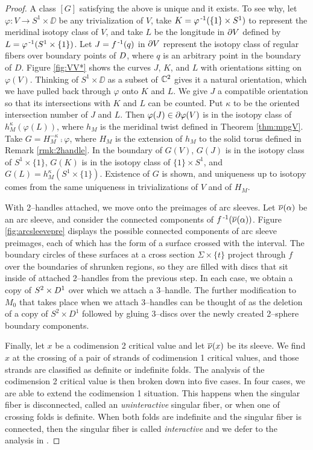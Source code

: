 \begin{proof}
	A class $[G]$ satisfying the above is unique and it exists.
	To see why, let $\varphi:V\to S^1\times\DD$ be any trivialization of $V$, take $K=\varphi^{\,\text{-}1}(\{1\}\times S^1)$ to represent the meridinal isotopy class of $V$, and take $L$ be the longitude in $\partial V$ defined by $L=\varphi^{\,\text{-}1}(S^1\times\{1\})$.
	Let $J=f^{\,\text{-}1}(q)$ in $\partial V$ represent the isotopy class of regular fibers over boundary points of $D$, where $q$ is an arbitrary point in the boundary of $D$.	
	Figure \ref{fig:VV*} shows the curves $J$, $K$, and $L$ with orientations sitting on $\varphi(V)$.
	Thinking of $S^1\times\DD$ as a subset of $\mathbb{C}^2$ gives it a natural orientation, which we have pulled back through $\varphi$ onto $K$ and $L$.
	We give $J$ a compatible orientation so that its intersections with $K$ and $L$ can be counted.
	Put $\kappa$ to be the oriented intersection number of $J$ and $L$.
	Then $\varphi(J)\in \partial\varphi(V)$ is in the isotopy class of $h_M^{\kappa}(\varphi(L))$, where $h_M$ is the meridinal twist defined in Theorem \ref{thm:mpgV}.
	Take $G=H_M^{-\kappa}\comp\varphi$, where $H_M$ is the extension of $h_M$ to the solid torus defined in Remark \ref{rmk:2handle}.
	In the boundary of $G(V)$, $G(J)$ is in the isotopy class of $S^1\times\{1\}$, $G(K)$ is in the isotopy class of $\{1\}\times S^1$, and $G(L)=h_M^\kappa(S^1\times\{1\})$.
	Existence of $G$ is shown, and uniqueness up to isotopy comes from the same uniqueness in trivializations of $V$ and of $H_M$.
		
	With 2--handles attached, we move onto the preimages of arc sleeves.
	Let $\overline{\nu}(\alpha)$ be an arc sleeve, and consider the connected components of $f^{\,\text{-}1}(\overline{\nu}(\alpha))$.
	Figure \ref{fig:arcsleevepre} displays the possible connected components of arc sleeve preimages, each of which has the form of a surface crossed with the interval.
	The boundary circles of these surfaces at a cross section $\Sigma\times\{t\}$ project through $f$ over the boundaries of shrunken regions, so they are filled with discs that sit inside of attached 2--handles from the previous step.
	In each case, we obtain a copy of $S^2\times D^1$ over which we attach a 3--handle.
	The further modification to $M_0$ that takes place when we attach 3--handles can be thought of as the deletion of a copy of $S^2\times D^1$ followed by gluing 3--discs over the newly created 2--sphere boundary components.

	
	Finally, let $x$ be a codimension 2 critical value and let $\overline{\nu}(x)$ be its sleeve.
	We find $x$ at the crossing of a pair of strands of codimension 1 critical values, and those strands are classified as definite or indefinite folds.
	The analysis of the codimension 2 critical value is then broken down into five cases.
	In four cases, we are able to extend the codimension 1 situation.
	This happens when the singular fiber is disconnected, called an \emph{uninteractive} singular fiber, or when one of crossing folds is definite.
	When both folds are indefinite and the singular fiber is connected, then the singular fiber is called \emph{interactive} and we defer to the analysis in \cite{CostThur08}.
	

\end{proof}
